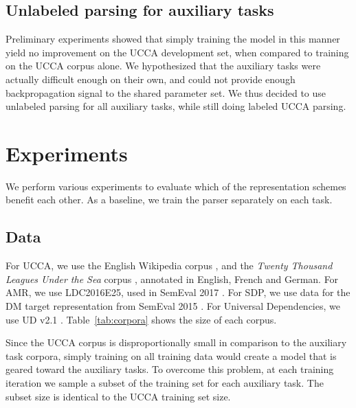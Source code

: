 \documentclass[11pt,a4paper]{article}
\begin{document}
\subsection{Unlabeled parsing for auxiliary tasks}\label{sec:unlabeld}

Preliminary experiments showed that simply training the model in this manner yield no improvement
on the UCCA development set, when compared to training on the UCCA corpus alone.
We hypothesized that the auxiliary tasks were actually difficult enough on their own,
and could not provide enough backpropagation signal to the shared parameter set.
We thus decided to use unlabeled parsing for all auxiliary tasks, while still doing labeled UCCA parsing.


\section{Experiments}\label{sec:experiments}

We perform various experiments to evaluate which of the representation schemes benefit each other.
As a baseline, we train the parser separately on each task.

\subsection{Data}\label{sec:data}

For UCCA, we use the English Wikipedia corpus \cite{abend2013universal},
and the \textit{Twenty Thousand Leagues Under the Sea} corpus \cite[20K leagues;][]{sulem2015conceptual},
annotated in English, French and German.
For AMR, we use LDC2016E25, used in SemEval 2017 \cite{may2017semeval}.
For SDP, we use data for the DM target representation from SemEval 2015 \cite{oepen2015semeval}.
For Universal Dependencies, we use UD v2.1 \cite{11234/1-2515}.
Table~\ref{tab:corpora} shows the size of each corpus.

Since the UCCA corpus is disproportionally small in comparison to the auxiliary task corpora,
simply training on all training data would create a model that is geared toward the auxiliary tasks.
To overcome this problem,
at each training iteration we sample a subset of the training set for each auxiliary task.
The subset size is identical to the UCCA training set size.
\end{document}
